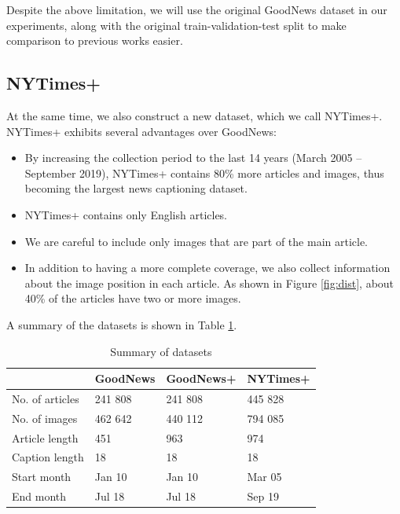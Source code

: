 \documentclass[10pt,twocolumn,letterpaper]{article}
\begin{document}
Despite the above limitation, we will use the original GoodNews dataset in our
experiments, along with the original train-validation-test split to make
comparison to previous works easier.

\subsection{NYTimes+}

At the same time, we also construct a new dataset, which we call NYTimes+.
NYTimes+ exhibits several advantages over GoodNews:

\begin{itemize}
   \item By increasing the collection period to the last 14 years (March 2005
   -- September 2019), NYTimes+ contains 80\% more articles and images, thus
   becoming the largest news captioning dataset.
   \item NYTimes+ contains only English articles.
   \item We are careful to include only images that are part of the main
   article.
   \item In addition to having a more complete coverage, we also collect
   information about the image position in each article. As shown in Figure
   \ref{fig:dist}, about 40\% of the articles have two or more images.
\end{itemize}

A summary of the datasets is shown in Table \ref{tab:datasets}.

\begin{table}[h]
	\caption {Summary of datasets}
	\label{tab:datasets}
	\centering
	\begin{tabular}{llll}
		\toprule
		  & GoodNews  & GoodNews+ &   NYTimes+ \\
		\midrule
      No. of articles & 241 808 & 241 808 & 445 828 \\
      No. of images   & 462 642 & 440 112 & 794 085 \\
      Article length & 451 & 963 & 974 \\
      Caption length & 18 & 18 & 18 \\
      Start month & Jan 10 & Jan 10 & Mar 05\\
      End month & Jul 18 & Jul 18 & Sep 19 \\
		\bottomrule
	\end{tabular}
\end{table}
\end{document}
